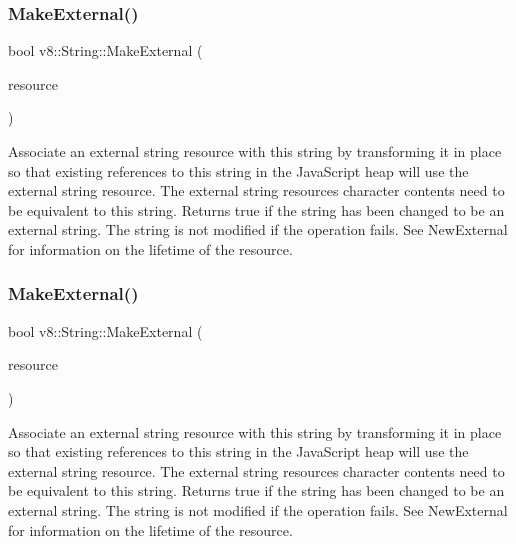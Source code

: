 \subsubsection{\texorpdfstring{Make\+External()}{MakeExternal()}\hspace{0.1cm}{\footnotesize\ttfamily [1/2]}}
{\footnotesize\ttfamily bool v8\+::\+String\+::\+Make\+External (\begin{DoxyParamCaption}\item[{\mbox{\hyperlink{classv8_1_1String_1_1ExternalStringResource}{External\+String\+Resource}} $\ast$}]{resource }\end{DoxyParamCaption})}

Associate an external string resource with this string by transforming it in place so that existing references to this string in the Java\+Script heap will use the external string resource. The external string resource\textquotesingle{}s character contents need to be equivalent to this string. Returns true if the string has been changed to be an external string. The string is not modified if the operation fails. See New\+External for information on the lifetime of the resource. \mbox{\label{classv8_1_1String_a607d632c720eec5133649f522aefa944}} 
\subsubsection{\texorpdfstring{Make\+External()}{MakeExternal()}\hspace{0.1cm}{\footnotesize\ttfamily [2/2]}}
{\footnotesize\ttfamily bool v8\+::\+String\+::\+Make\+External (\begin{DoxyParamCaption}\item[{\mbox{\hyperlink{classv8_1_1String_1_1ExternalOneByteStringResource}{External\+One\+Byte\+String\+Resource}} $\ast$}]{resource }\end{DoxyParamCaption})}

Associate an external string resource with this string by transforming it in place so that existing references to this string in the Java\+Script heap will use the external string resource. The external string resource\textquotesingle{}s character contents need to be equivalent to this string. Returns true if the string has been changed to be an external string. The string is not modified if the operation fails. See New\+External for information on the lifetime of the resource. \mbox{\label{classv8_1_1String_ad0491e4a3506df9ef9bfc08fca0d7a34}} 
